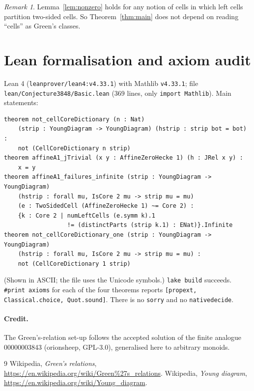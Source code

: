 \documentclass[11pt]{article}
\theoremstyle{definition}
\theoremstyle{remark}
\newtheorem{remark}[theorem]{Remark}
\renewcommand{\_}{\oldus\allowbreak}
\begin{document}
\begin{remark}
Lemma~\ref{lem:nonzero} holds for any notion of cells in which left cells partition two-sided cells.
So Theorem~\ref{thm:main} does not depend on reading ``cells'' as Green's classes.
\end{remark}

\section{Lean formalisation and axiom audit}

Lean 4 (\texttt{leanprover/lean4:v4.33.1}) with Mathlib \texttt{v4.33.1}; file
\texttt{lean/Conjecture3848/Basic.lean} (369 lines, only \texttt{import Mathlib}). Main statements:

{\small\begin{verbatim}
theorem not_cellCoreDictionary (n : Nat)
    (strip : YoungDiagram -> YoungDiagram) (hstrip : strip bot = bot) :
    not (CellCoreDictionary n strip)
theorem affineA1_jTrivial (x y : AffineZeroHecke 1) (h : JRel x y) :
    x = y
theorem affineA1_failures_infinite (strip : YoungDiagram -> YoungDiagram)
    (hstrip : forall mu, IsCore 2 mu -> strip mu = mu)
    (e : TwoSidedCell (AffineZeroHecke 1) ~= Core 2) :
    {k : Core 2 | numLeftCells (e.symm k).1
                  != (distinctParts (strip k.1) : ENat)}.Infinite
theorem not_cellCoreDictionary_one (strip : YoungDiagram -> YoungDiagram)
    (hstrip : forall mu, IsCore 2 mu -> strip mu = mu) :
    not (CellCoreDictionary 1 strip)
\end{verbatim}}
(Shown in ASCII; the file uses the Unicode symbols.) \texttt{lake build} succeeds. \texttt{\#print axioms} for each of the four theorems reports
\texttt{[propext, Classical.choice, Quot.sound]}. There is no \texttt{sorry} and no \texttt{native\_decide}.

\paragraph{Credit.} The Green's-relation set-up follows the accepted solution of the finite analogue
00000003843 (orionsheep, GPL-3.0), generalised here to arbitrary monoids.

\begin{thebibliography}{9}
 Wikipedia, \emph{Green's relations}, \url{https://en.wikipedia.org/wiki/Green\%27s_relations}.
 Wikipedia, \emph{Young diagram}, \url{https://en.wikipedia.org/wiki/Young_diagram}.
\end{thebibliography}
\end{document}
